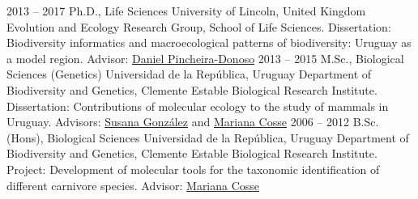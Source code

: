 \documentclass[9pt]{developercv} %
\begin{document}



\begin{entrylist}
	\entry
		{2013 -- 2017}
		{Ph.D., Life Sciences}
		{University of Lincoln, United Kingdom}
		{Evolution and Ecology Research Group, School of Life Sciences. Dissertation: Biodiversity informatics and macroecological patterns of biodiversity: Uruguay as a model region. Advisor: \href{http://selectiondynamics.weebly.com/daniel-pincheira-donoso.html}{Daniel Pincheira-Donoso}}
	\entry
		{2013 -- 2015}
		{M.Sc., Biological Sciences (Genetics)}
		{Universidad de la Rep\'{u}blica, Uruguay}
		{Department of Biodiversity and Genetics, Clemente Estable Biological Research Institute. Dissertation: Contributions of molecular ecology to the study of mammals in Uruguay. Advisors: \href{https://scholar.google.com.uy/citations?user=FSrtqaMAAAAJ&hl=en}{Susana González} and \href{https://scholar.google.com/citations?user=uWh1ONQAAAAJ&hl=es}{Mariana Cosse}}
	\entry
		{2006 -- 2012}
		{B.Sc. (Hons), Biological Sciences}
		{Universidad de la Rep\'{u}blica, Uruguay}
		{Department of Biodiversity and Genetics, Clemente Estable Biological Research Institute. Project: Development of molecular tools for the taxonomic identification of different carnivore species. Advisor: \href{https://scholar.google.com/citations?user=uWh1ONQAAAAJ&hl=es}{Mariana Cosse}}
\end{entrylist}
\end{document}
